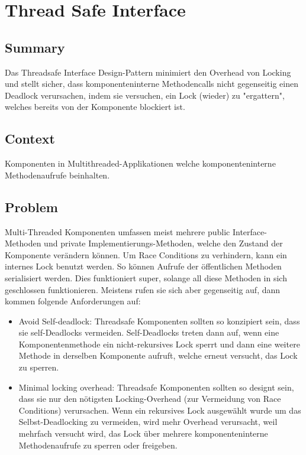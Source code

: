 \chapter{Thread Safe Interface}

\section{Summary}
Das Threadsafe Interface Design-Pattern minimiert den Overhead von Locking und stellt sicher, dass komponenteninterne Methodencalls nicht gegenseitig einen Deadlock verursachen, indem sie versuchen, ein Lock (wieder) zu "ergattern", welches bereits von der Komponente blockiert ist.

\section{Context}
Komponenten in Multithreaded-Applikationen welche komponenteninterne Methodenaufrufe beinhalten.

\section{Problem}
Multi-Threaded Komponenten umfassen meist mehrere public Interface-Methoden und private Implementierungs-Methoden, welche den Zustand der Komponente verändern können. Um Race Conditions zu verhindern, kann ein internes Lock benutzt werden. So können Aufrufe der öffentlichen Methoden serialisiert werden. Dies funktioniert super, solange all diese Methoden in sich geschlossen funktionieren. Meistens rufen sie sich aber gegenseitig auf, dann kommen folgende Anforderungen auf:

\begin{itemize}
  \item Avoid Self-deadlock: Threadsafe Komponenten sollten so konzipiert sein, dass sie self-Deadlocks vermeiden. Self-Deadlocks treten dann auf, wenn eine Komponentenmethode ein nicht-rekursives Lock sperrt und dann eine weitere Methode in derselben Komponente aufruft, welche erneut versucht, das Lock zu sperren.
  \item Minimal locking overhead: Threadsafe Komponenten sollten so designt sein, dass sie nur den nötigsten Locking-Overhead (zur Vermeidung von Race Conditions) verursachen. Wenn ein rekursives Lock ausgewählt wurde um das Selbst-Deadlocking zu vermeiden, wird mehr Overhead verursacht, weil mehrfach versucht wird, das Lock über mehrere komponenteninterne Methodenaufrufe zu sperren oder freigeben.
\end{itemize}

